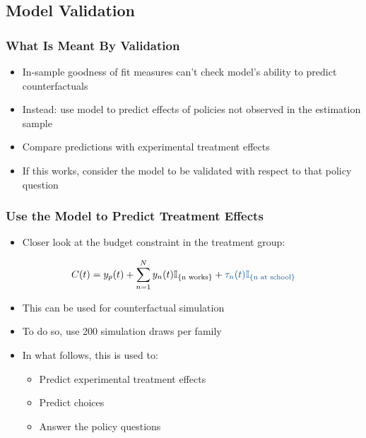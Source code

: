 \documentclass[11pt]{beamer}
\begin{document}
\subsection{Model Validation}

\begin{frame}[c]\frametitle{What Is Meant By Validation}
    \begin{itemize}
        \item In-sample goodness of fit measures can't check model's ability to predict counterfactuals
        \item Instead: use model to predict effects of policies not observed in the estimation sample
        \item Compare predictions with experimental treatment effects
        \item If this works, consider the model to be validated with respect to that policy question
    \end{itemize}
\end{frame}


\begin{frame}[c]\frametitle{Use the Model to Predict Treatment Effects}
    \begin{itemize}
        \item Closer look at the budget constraint in the treatment group:
    \end{itemize}
        \begin{equation}
            C(t) = y_p(t) + \sum_{n = 1}^{N} y_n(t) \mathbb{I}_{\{\text{n works}\}} + \textcolor{mediumelectricblue}{\tau_n(t) \mathbb{I}_{\{\text{n at school}\}}}
        \end{equation}
    \begin{itemize}
        \item This can be used for counterfactual simulation
        \item To do so, use 200 simulation draws per family
        \item In what follows, this is used to:
        \begin{itemize}
            \item Predict experimental treatment effects
            \item Predict choices
            \item Answer the policy questions
        \end{itemize}
    \end{itemize}
\end{frame}
\end{document}
